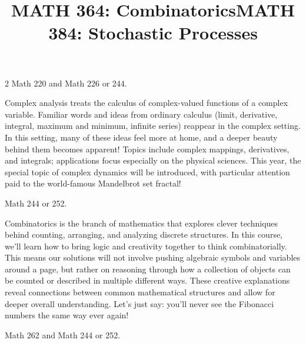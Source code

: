 \documentclass[12pt]{article}
\newcommand{\bolder}{\textbf}
\begin{document}
\begin{multicols}{2}
 Math 220 and Math 226 or 244.

Complex analysis treats the calculus of complex-valued functions of a complex variable. Familiar words and ideas from ordinary calculus (limit, derivative, integral, maximum and minimum, infinite series) reappear in the complex setting. In this setting, many of these ideas feel more at home, and a deeper beauty behind them becomes apparent! Topics include complex mappings, derivatives, and integrals; applications focus especially on the physical sciences. This year, the special topic of complex dynamics will be introduced, with particular attention paid to the world-famous Mandelbrot set fractal!


\begin{tcolorbox}[colback=white, colframe=black]
    \begin{center}
    \title{{\large \bolder{MATH 364: Combinatorics}}}
    \end{center}
\end{tcolorbox}

 Math 244 or 252.

Combinatorics is the branch of mathematics that explores clever techniques behind counting, arranging, and analyzing discrete structures. In this course, we’ll learn how to bring logic and creativity together to think combinatorially.  This means our solutions will not involve pushing algebraic symbols and variables around a page, but rather on reasoning through how a collection of objects can be counted or described in multiple different ways.  These creative explanations reveal connections between common mathematical structures and allow for deeper overall understanding.  Let's just say: you'll never see the Fibonacci numbers the same way ever again!


\begin{tcolorbox}[colback=white, colframe=black]
    \begin{center}
    \title{{\large \bolder{MATH 384: Stochastic Processes}}}
    \end{center}
\end{tcolorbox}

 Math 262 and Math 244 or 252.



\end{multicols}
\end{document}
